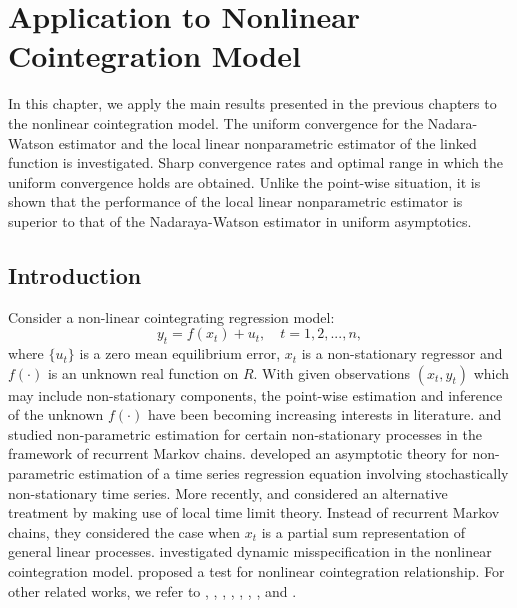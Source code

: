 \chapter{Application to Nonlinear Cointegration Model} 
\ifpdf
    \graphicspath{{Chapter4/Chapter4Figs/PNG/}{Chapter4/Chapter4Figs/PDF/}{Chapter4/Chapter4Figs/}}
\else
    \graphicspath{{Chapter4/Chapter4Figs/EPS/}{Chapter4/Chapter4Figs/}}
\fi

In this chapter, we apply the main results presented in the previous chapters to the nonlinear cointegration model. The uniform convergence for the Nadara-Watson estimator and the local linear nonparametric  estimator of the linked function is investigated. Sharp convergence rates and optimal range in which the uniform convergence holds are obtained. Unlike the point-wise situation, it is shown that the performance of the local linear nonparametric  estimator is superior to that of the Nadaraya-Watson estimator in uniform asymptotics.


\section{Introduction}

Consider a non-linear cointegrating regression model:
\begin{equation}
y_{t}=f(x_{t})+u_{t},\quad t=1,2,...,n,  \label{eqn:4:mo1}
\end{equation}%
where $\{u_{t}\}$ is a  zero mean  equilibrium error, $x_{t}$ is a
non-stationary  regressor and  $f(\cdot)$ is an unknown  real function on $R$. With given observations $(x_t, y_t)$ which may include
non-stationary components, the point-wise estimation  and
inference of the unknown $f(\cdot)$ have been becoming increasing
interests in literature. \cite{karlsentjostheim2001} and \cite{guerre2004} studied
non-parametric estimation for certain non-stationary processes in the
framework of recurrent Markov chains. \cite{karlsenmyklebusttjostheim2007}
developed an asymptotic theory for non-parametric estimation of a
time series regression equation involving stochastically
non-stationary time series. More recently,  \citet[][\citeyear{wangphillips2010a}, \citeyear{wangphillips2010b}]{wangphillips2009} and \cite{cailipark2009} considered an alternative treatment by making use of local
time limit theory. Instead of recurrent Markov chains, they considered the case when
$x_t$ is a partial sum representation of general linear processes. \cite{kasparisphillips2012} investigated dynamic misspecification in the nonlinear cointegration model. \cite{choisaikkonen2010} proposed a test for nonlinear cointegration relationship. For other related works, we refer to \citet[][\citeyear{parkphillips2001}]{parkphillips1999}, \cite{bandi2004}, \citet[][\citeyear{gaomaxwelllutjostheim2009b}]{gaomaxwelllutjostheim2009a}, \cite{choisaikkonen2004},  \cite{marmer2008}, \cite{chengaoli2009}, \cite{wangphillips2012}, and \cite{wang2013}.

